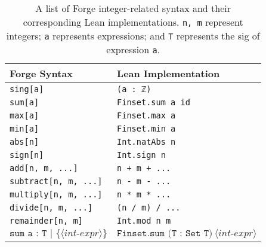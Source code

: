 \vspace{-1em}
\begin{table}[h!]
  \renewcommand{\arraystretch}{1.1}
  \centering
  \caption{A list of Forge integer-related syntax and their corresponding Lean implementations. \texttt{n, m} represent integers; \texttt{a} represents expressions; and \texttt{T} represents the sig of expression \texttt{a}.\\[-0.5em]}
  \label{tab:ints}
  \begin{tabular}{>{\columncolor{forgelistingcolor}}l >{\columncolor{leanlistingcolor}}l@{}}
      \hline
  \cellcolor{white}\textbf{Forge Syntax} & \cellcolor{white}\textbf{Lean Implementation}                     \\ \hline
  \texttt{sing[a]} & \texttt{(a : ℤ)} \\
  \texttt{sum[a]} & \texttt{Finset.sum a id} \\
  \texttt{max[a]} & \texttt{Finset.max a}\footnotemark \\
  \texttt{min[a]} & \texttt{Finset.min a} \\
  \texttt{abs[n]} & \texttt{Int.natAbs n} \\
  \texttt{sign[n]} & \texttt{Int.sign n} \\
  \texttt{add[n, m, ...]} & \texttt{n + m + ...} \\
  \texttt{subtract[n, m, ...]} & \texttt{n - m - ...} \\
  \texttt{multiply[n, m, ...]} & \texttt{n * m * ...} \\
  \texttt{divide[n, m, ...]} & \texttt{(n / m) / ...} \\
  \texttt{remainder[n, m]} & \texttt{Int.mod n m} \\
  $\texttt{sum a : T | \{} \langle \textit{int-expr} \rangle \texttt{\}}$ & $\texttt{Finset.sum (T : Set T)}\ \langle \textit{int-expr} \rangle$ \\
  \hline
  \end{tabular}
\end{table}
